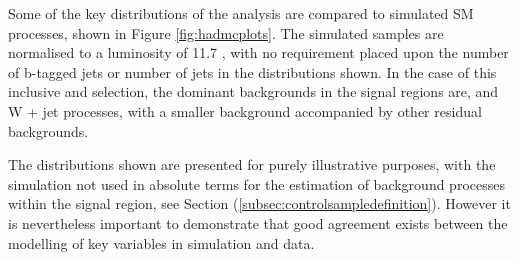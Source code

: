 Some of the key distributions of the analysis are compared to simulated \ac{SM} processes, shown in Figure \ref{fig:hadmcplots}. The simulated samples are normalised to a luminosity of 11.7 \fb,  with no requirement placed upon the number of b-tagged jets or number of jets in the distributions shown. In the case of this inclusive \nbreco and \njet selection, the dominant backgrounds in the signal regions are, \zinv and W + jet processes, with a smaller \ttbar background accompanied by other residual backgrounds. 

The distributions shown are presented for purely illustrative purposes, with the simulation not used in absolute terms for the estimation of background processes within the signal region, see Section (\ref{subsec:controlsampledefinition}). However it is nevertheless important to demonstrate that good agreement exists between the modelling of key variables in simulation and data.

